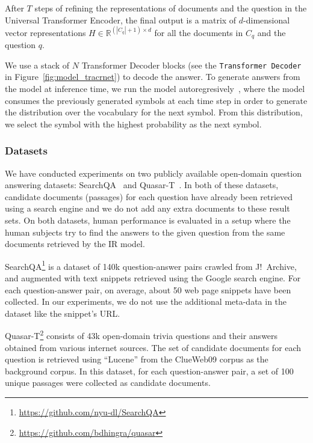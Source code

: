 After $T$ steps of refining the representations of documents and the question in the Universal Transformer Encoder, the final output is a matrix of $d$-dimensional vector representations $H \in \mathbb{R}^{(|C_q|+1) \times d}$ for all the documents in $C_q$ and the question $q$.

We use a stack of $N$ Transformer Decoder blocks (see  the \texttt{Transformer Decoder} in Figure~\ref{fig:model_tracrnet}) to decode the answer.
To generate answers from the model at inference time, we run the model autoregresively~\citep{graves2013generating}, where the model consumes the previously generated symbols at each time step in order to generate the distribution over the vocabulary for the next symbol. From this distribution, we select the symbol with the highest probability as the next symbol.   


\subsubsection{Datasets}
We have conducted experiments on two publicly available open-domain question answering datasets: SearchQA~\citep{dunn2017searchqa} and Quasar-T~\citep{dhingra2017quasar}. 
In both of these datasets, candidate documents (passages) for each question have already been retrieved using a search engine and we do not add any extra documents to these result sets. 
On both datasets, human performance is evaluated in a setup where the human subjects try to find the answers to the given question from the same documents retrieved by the IR model.

SearchQA\footnote{\url{https://github.com/nyu-dl/SearchQA}} is a dataset of 140k question-answer pairs crawled from J!\ Archive, and augmented with text snippets retrieved using the Google search engine. 
For each question-answer pair, on average, about 50 web page snippets have been collected. 
In our experiments, we do not use the additional meta-data in the dataset like the snippet's URL.

Quasar-T\footnote{\url{https://github.com/bdhingra/quasar}} consists of 43k open-domain trivia questions and their answers obtained from various internet sources. 
The set of candidate documents for each question is retrieved using ``Lucene'' from the ClueWeb09 corpus as the background corpus. 
In this dataset, for each question-answer pair, a set of 100 unique passages were collected as candidate documents.

